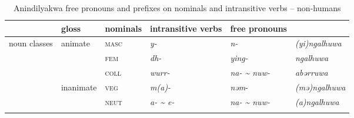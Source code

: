 \documentclass[output=paper]{langscibook}
\begin{document}
\begin{table}
\begin{tabularx}{\textwidth}{XXXXXX}
\lsptoprule
& gloss & nominals & intransitive verbs & free pronouns \\
\hline
{noun classes} & {animate} & \textsc{masc} & \textit{y-} & \textit{n-} & \textit{(yi)ngalhuwa}\\
 & & \textsc{fem} & \textit{dh-} & \textit{ying-} & \textit{ngalhuwa}\\
& & \textsc{coll} & \textit{wurr-} & \textit{na- {\textasciitilde} nuw-} & \textit{abərruwa}\\
& {inanimate} & \textsc{veg} & \textit{m(a)-} & \textit{nəm}- & \textit{(mə)ngalhuwa}\\
 & & \textsc{neut} & \textit{a- {\textasciitilde} e-} & \textit{na- {\textasciitilde} nuw-} & \textit{(a)ngalhuwa}\\
 \lspbottomrule
\end{tabularx}
\caption{Anindilyakwa free pronouns and prefixes on nominals and intransitive verbs -- non-humans}
\label{tab:vanegmond:2}
\end{table}
\end{document}
